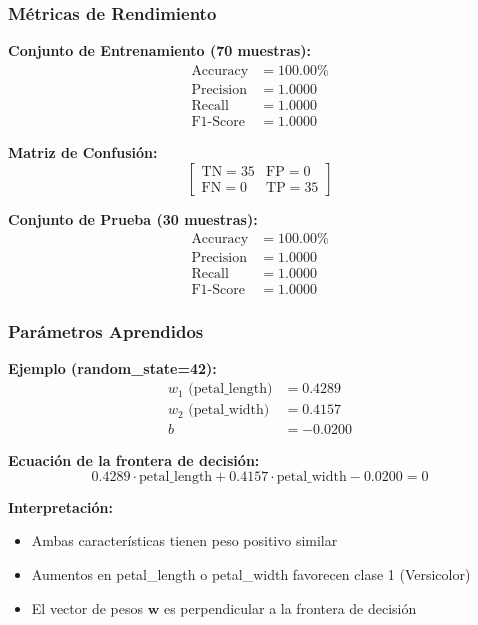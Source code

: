 \documentclass[12pt]{src/formato_utem}
\begin{document}
\subsubsection{Métricas de Rendimiento}

\textbf{Conjunto de Entrenamiento (70 muestras):}
\begin{align*}
\text{Accuracy} &= 100.00\% \\
\text{Precision} &= 1.0000 \\
\text{Recall} &= 1.0000 \\
\text{F1-Score} &= 1.0000
\end{align*}

\textbf{Matriz de Confusión:}
\[
\begin{bmatrix}
\text{TN} = 35 & \text{FP} = 0 \\
\text{FN} = 0 & \text{TP} = 35
\end{bmatrix}
\]

\textbf{Conjunto de Prueba (30 muestras):}
\begin{align*}
\text{Accuracy} &= 100.00\% \\
\text{Precision} &= 1.0000 \\
\text{Recall} &= 1.0000 \\
\text{F1-Score} &= 1.0000
\end{align*}

\subsubsection{Parámetros Aprendidos}

\textbf{Ejemplo (random\_state=42):}
\begin{align*}
w_1 \text{ (petal\_length)} &= 0.4289 \\
w_2 \text{ (petal\_width)} &= 0.4157 \\
b &= -0.0200
\end{align*}

\textbf{Ecuación de la frontera de decisión:}
\[
0.4289 \cdot \text{petal\_length} + 0.4157 \cdot \text{petal\_width} - 0.0200 = 0
\]

\textbf{Interpretación:}
\begin{itemize}
    \item Ambas características tienen peso positivo similar
    \item Aumentos en petal\_length o petal\_width favorecen clase 1 (Versicolor)
    \item El vector de pesos $\mathbf{w}$ es perpendicular a la frontera de decisión
\end{itemize}
\end{document}
